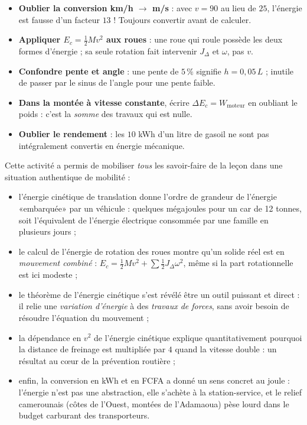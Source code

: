 \documentclass[11pt]{article}
\newcounter{popsec}
\newcounter{popsub}
\newcommand{\courssub}[1]{%
  \stepcounter{popsub}%
  \par\vspace{9pt}\noindent{\popxbold\fontsize{11.5}{13}\selectfont\color{popink}{\color{poporange}\thepopsec.\thepopsub}\hspace{6pt}#1}\par\nopagebreak\vspace{4pt}
}
\begin{document}
\begin{attention}
\begin{itemize}
\item \textbf{Oublier la conversion km/h $\to$ m/s} : avec $v = 90$ au lieu de $25$, l'énergie est fausse d'un facteur $13$ ! Toujours convertir avant de calculer.
\item \textbf{Appliquer $E_c = \frac{1}{2}Mv^{2}$ aux roues} : une roue qui roule possède les deux formes d'énergie ; sa seule rotation fait intervenir $J_{\Delta}$ et $\omega$, pas $v$.
\item \textbf{Confondre pente et angle} : une pente de $5\,\%$ signifie $h = 0,05\,L$ ; inutile de passer par le sinus de l'angle pour une pente faible.
\item \textbf{Dans la montée à vitesse constante}, écrire $\Delta E_c = W_{\text{moteur}}$ en oubliant le poids : c'est la \emph{somme} des travaux qui est nulle.
\item \textbf{Oublier le rendement} : les $10$ kWh d'un litre de gasoil ne sont pas intégralement convertis en énergie mécanique.
\end{itemize}
\end{attention}

\courssub{Bilan de l'activité}

Cette activité a permis de mobiliser \emph{tous} les savoir-faire de la leçon dans une situation authentique de mobilité :

\begin{itemize}
\item l'énergie cinétique de translation donne l'ordre de grandeur de l'énergie «\;embarquée\;» par un véhicule : quelques mégajoules pour un car de 12 tonnes, soit l'équivalent de l'énergie électrique consommée par une famille en plusieurs jours ;
\item le calcul de l'énergie de rotation des roues montre qu'un solide réel est en \emph{mouvement combiné} : $E_c = \frac{1}{2}Mv^{2} + \sum\frac{1}{2}J_{\Delta}\omega^{2}$, même si la part rotationnelle est ici modeste ;
\item le théorème de l'énergie cinétique s'est révélé être un outil puissant et direct : il relie une \emph{variation d'énergie} à des \emph{travaux de forces}, sans avoir besoin de résoudre l'équation du mouvement ;
\item la dépendance en $v^{2}$ de l'énergie cinétique explique quantitativement pourquoi la distance de freinage est multipliée par $4$ quand la vitesse double : un résultat au cœur de la prévention routière ;
\item enfin, la conversion en kWh et en FCFA a donné un sens concret au joule : l'énergie n'est pas une abstraction, elle s'achète à la station-service, et le relief camerounais (côtes de l'Ouest, montées de l'Adamaoua) pèse lourd dans le budget carburant des transporteurs.
\end{itemize}
\end{document}

